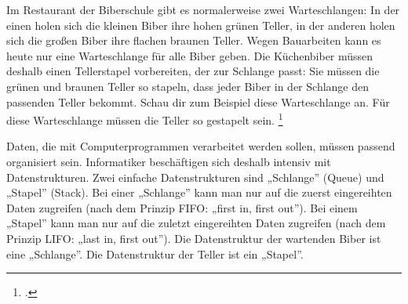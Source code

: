 \documentclass{bschlangaul-aufgabe}
\begin{document}

Im Restaurant der Biberschule gibt es normalerweise zwei Warteschlangen:
In der einen holen sich die kleinen Biber ihre hohen grünen Teller, in
der anderen holen sich die großen Biber ihre flachen braunen Teller.
Wegen Bauarbeiten kann es heute nur eine Warteschlange für alle Biber
geben. Die Küchenbiber müssen deshalb einen Tellerstapel vorbereiten,
der zur Schlange passt: Sie müssen die grünen und braunen Teller so
stapeln, dass jeder Biber in der Schlange den passenden Teller bekommt.
Schau dir zum Beispiel diese Warteschlange an. Für diese Warteschlange
müssen die Teller so gestapelt sein.
\footcite[Seite 35]{net:pdf:informatik-biber-2010}

\begin{bAntwort}
Daten, die mit Computerprogrammen verarbeitet werden sollen, müssen
passend organisiert sein. Informatiker beschäftigen sich deshalb
intensiv mit Datenstrukturen. Zwei einfache Datenstrukturen sind
„Schlange” (Queue) und „Stapel” (Stack). Bei einer „Schlange” kann man
nur auf die zuerst eingereihten Daten zugreifen (nach dem Prinzip FIFO:
„first in, first out”). Bei einem „Stapel” kann man nur auf die zuletzt
eingereihten Daten zugreifen (nach dem Prinzip LIFO: „last in, first
out”). Die Datenstruktur der wartenden Biber ist eine „Schlange”. Die
Datenstruktur der Teller ist ein „Stapel”.
\end{bAntwort}
\end{document}
